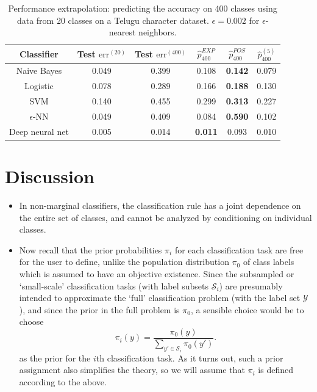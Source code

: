 \documentclass[12pt]{article}
\begin{document}
\begin{table}
\centering
\begin{tabular}{|c||c|c|c|c|c|}\hline
Classifier      & Test $\text{err}^{(20)}$ & Test $\text{err}^{(400)}$ & $\hat{p}^{EXP}_{400}$ & $\hat{p}^{POS}_{400}$ & $\hat{p}^{(5)}_{400}$\\ \hline
Naive Bayes     & 0.049                   & 0.399                   & 0.108              & \textbf{0.142}      & 0.079             \\ \hline
Logistic        & 0.078                   & 0.289                   & 0.166              & \textbf{0.188}      & 0.130             \\ \hline
SVM             & 0.140                   & 0.455                   & 0.299              & \textbf{0.313}      & 0.227             \\ \hline
$\epsilon$-NN   & 0.049                   & 0.409                   & 0.084              & \textbf{0.590}      & 0.102             \\ \hline
Deep neural net & 0.005                   & 0.014                   & \textbf{0.011}     & 0.093               & 0.010             \\ \hline
\end{tabular}
\caption{Performance extrapolation: predicting the accuracy on 400 classes using data from 20 classes on a Telugu character dataset.
$\epsilon = 0.002$ for $\epsilon$-nearest neighbors.}
\end{table}

\section{Discussion}

\begin{itemize}
\item In non-marginal classifiers, the classification rule has
a joint dependence on the entire set of classes, and cannot be
analyzed by conditioning on individual classes.
\item Now recall that the prior probabilities $\pi_i$ for each
classification task are free for the user to define, unlike the
population distribution $\pi_0$ of class labels which is assumed to
have an objective existence.  Since the subsampled or `small-scale'
classification tasks (with label subsets $\mathcal{S}_i$) are
presumably intended to approximate the `full' classification problem
(with the label set $\mathcal{Y}$), and since the prior in the full
problem is $\pi_0$, a sensible choice would be to choose
\[
\pi_i(y) = \frac{\pi_0(y)}{\sum_{y' \in \mathcal{S}_i} \pi_0(y')}.
\]
as the prior for the $i$th classification task.  As it turns out, such
a prior assignment also simplifies the theory, so we will assume that
$\pi_i$ is defined according to the above.
\end{itemize}
\end{document}
